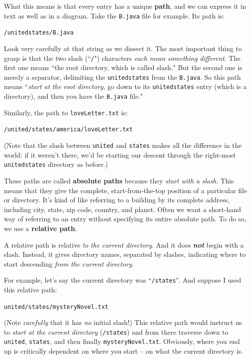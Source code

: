 What this means is that every entry has a unique \textbf{path}, and we can
express it in text as well as in a diagram. Take the \texttt{B.java} file for
example. Its path is:

\quad\quad \texttt{/unitedstates/B.java}

Look very carefully at that string as we dissect it. The most important thing
to grasp is that the two slash (``\texttt{/}") characters \textit{each mean
something different}. The first one means ``the root directory, which is
called slash." But the second one is merely a separator, delimiting the
\texttt{unitedstates} from the \texttt{B.java}. So this path means
``\textit{start at the root directory}, go down to its \texttt{unitedstates}
entry (which is a directory), and then you have the \texttt{B.java} file."

Similarly, the path to \texttt{loveLetter.txt} is:

\quad\quad \texttt{/united/states/america/loveLetter.txt}

(Note that the slash between \texttt{united} and \texttt{states} makes all the
difference in the world: if it weren't there, we'd be starting our descent
through the right-most \texttt{unitedstates} directory as before.)

These paths are called \textbf{absolute paths} because they \textit{start with
a slash}. This means that they give the complete, start-from-the-top position
of a particular file or directory. It's kind of like referring to a building
by its complete address, including city, state, zip code, country, and planet.
Often we want a short-hand way of referring to an entry without specifying its
entire absolute path. To do so, we use a \textbf{relative path}.

A relative path is relative \textit{to the current directory}. And it does
\textit{\textbf{not}} begin with a slash. Instead, it gives directory names,
separated by slashes, indicating where to start descending \textit{from the
current directory}.

For example, let's say the current directory was ``\texttt{/states}". And
suppose I used this relative path:

\quad\quad \texttt{united/states/mysteryNovel.txt}

(Note \textit{carefully} that it has \textit{no} initial slash!) This relative
path would instruct us to \textit{start at the current directory}
(\texttt{/states}) and from there traverse down to \texttt{united},
\texttt{states}, and then finally \texttt{mysteryNovel.txt}. Obviously, where
you end up is critically dependent on where you start -- on what the current
directory is.

